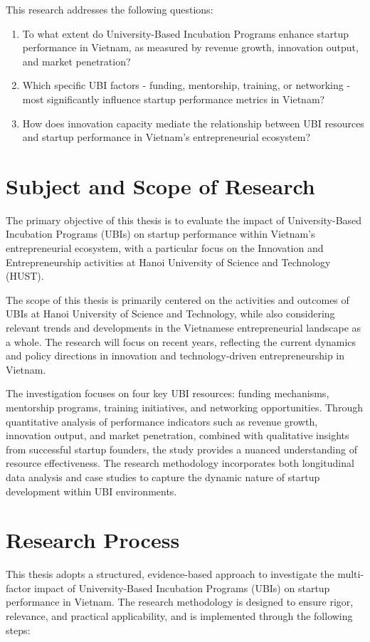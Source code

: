 \documentclass[../Main.tex]{subfiles}
\begin{document}
	This research addresses the following questions:
	\begin{enumerate}
		\item To what extent do University-Based Incubation Programs enhance startup performance in Vietnam, as measured by revenue growth, innovation output, and market penetration?
		\item Which specific UBI factors - funding, mentorship, training, or networking - most significantly influence startup performance metrics in Vietnam?
		\item How does innovation capacity mediate the relationship between UBI resources and startup performance in Vietnam's entrepreneurial ecosystem?
	\end{enumerate}

	\section{Subject and Scope of Research}
	\label{section:1.3_Subject_and_scope_of_research}
	The primary objective of this thesis is to evaluate the impact of University-Based Incubation Programs (UBIs) on startup performance within Vietnam's entrepreneurial ecosystem, with a particular focus on the Innovation and Entrepreneurship activities at Hanoi University of Science and Technology (HUST).

	The scope of this thesis is primarily centered on the activities and outcomes of UBIs at Hanoi University of Science and Technology, while also considering relevant trends and developments in the Vietnamese entrepreneurial landscape as a whole. The research will focus on recent years, reflecting the current dynamics and policy directions in innovation and technology-driven entrepreneurship in Vietnam.

	The investigation focuses on four key UBI resources: funding mechanisms, mentorship programs, training initiatives, and networking opportunities. Through quantitative analysis of performance indicators such as revenue growth, innovation output, and market penetration, combined with qualitative insights from successful startup founders, the study provides a nuanced understanding of resource effectiveness. The research methodology incorporates both longitudinal data analysis and case studies to capture the dynamic nature of startup development within UBI environments.

	\section{Research Process}
	\label{section:1.4_Research_process}
	This thesis adopts a structured, evidence-based approach to investigate the multi-factor impact of University-Based Incubation Programs (UBIs) on startup performance in Vietnam. The research methodology is designed to ensure rigor, relevance, and practical applicability, and is implemented through the following steps:
\end{document}
